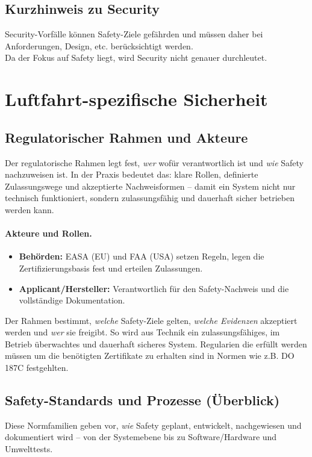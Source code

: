 \subsection{Kurzhinweis zu Security}
Security-Vorfälle können Safety-Ziele gefährden und müssen daher bei Anforderungen, Design, etc. berücksichtigt werden. \\
Da der Fokus auf Safety liegt, wird Security nicht genauer durchleutet.


\section{Luftfahrt-spezifische Sicherheit}

\subsection{Regulatorischer Rahmen und Akteure}
Der regulatorische Rahmen legt fest, \emph{wer} wofür verantwortlich ist und \emph{wie} Safety nachzuweisen ist. 
In der Praxis bedeutet das: klare Rollen, definierte Zulassungswege und akzeptierte Nachweisformen – damit ein System nicht nur technisch funktioniert, sondern zulassungsfähig und dauerhaft sicher betrieben werden kann.

\paragraph{Akteure und Rollen.}
\begin{itemize}
  \item \textbf{Behörden:} EASA (EU) und FAA (USA) setzen Regeln, legen die Zertifizierungsbasis fest und erteilen Zulassungen.
  \item \textbf{Applicant/Hersteller:} Verantwortlich für den Safety-Nachweis und die vollständige Dokumentation.
\end{itemize}

Der Rahmen bestimmt, \emph{welche} Safety-Ziele gelten, \emph{welche Evidenzen} akzeptiert werden und \emph{wer} sie freigibt. 
So wird aus Technik ein zulassungsfähiges, im Betrieb überwachtes und dauerhaft sicheres System.
Regularien die erfüllt werden müssen um die benötigten Zertifikate zu erhalten sind in Normen wie z.B. DO 187C festgehlten.

\subsection{Safety-Standards und Prozesse (Überblick)}
Diese Normfamilien geben vor, \emph{wie} Safety geplant, entwickelt, nachgewiesen und dokumentiert wird – von der Systemebene bis zu Software/Hardware und Umwelttests.

